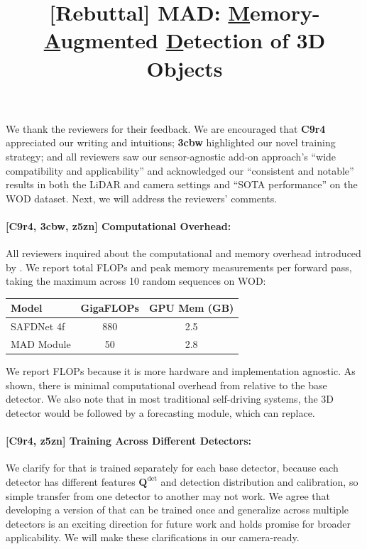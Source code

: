 \documentclass[10pt,twocolumn,letterpaper]{article}
\title{\vspace{-1mm}[Rebuttal] MAD: \underline{M}emory-\underline{A}ugmented \underline{D}etection of 3D Objects\vspace{-2mm}}
\newcommand{\reviewerOne}{{\textcolor{TealBlue}{\textbf{C9r4}}}}
\newcommand{\reviewerTwo}{{\textcolor{Mulberry}{\textbf{3cbw}}}}
\newcommand{\reviewerThree}{{\textcolor{BurntOrange}{\textbf{z5zn}}}}
\begin{document}
\makeatletter
{}
\makeatother

\maketitle
\thispagestyle{empty}
\appendix

We thank the reviewers for their feedback.
We are encouraged that \reviewerOne{} appreciated our writing and intuitions; \reviewerTwo{} highlighted our novel training strategy;
and all reviewers saw our sensor-agnostic add-on approach's ``wide compatibility and applicability'' and acknowledged our ``consistent and notable'' results in both the LiDAR and camera settings and ``SOTA performance'' on the WOD dataset. Next, we will address the reviewers' comments.

\paragraph{[\reviewerOne{}, \reviewerTwo{}, \reviewerThree{}] Computational Overhead:}
All reviewers inquired about the computational and memory overhead introduced by \ourmodel{}.
We report total FLOPs and peak memory measurements per forward pass,
taking the maximum across 10 random sequences on WOD:
\vspace{-2mm}
\begin{center}
\footnotesize
\begin{tabular}{lcc}
\toprule
\textbf{Model} & \textbf{GigaFLOPs} & \textbf{GPU Mem (GB)} \\
\midrule
SAFDNet 4f        & 880 & 2.5 \\
MAD Module        & 50  & 2.8 \\
\bottomrule
\end{tabular}
\end{center}
\vspace{-1mm}
We report FLOPs because it is more hardware and implementation agnostic.
As shown, there is minimal computational overhead from \ourmodel{} relative to the base detector.
We also note that in most traditional self-driving systems, the 3D detector would be followed by a forecasting module,
which \ourmodel{} can replace.

\paragraph{[\reviewerOne{}, \reviewerThree{}] Training \ourmodel{} Across Different Detectors:}
We clarify for that \ourmodel{} is trained separately for each base detector, because each detector has different features $\mathbf{Q}^{\textrm{det}}$ and detection distribution and calibration, so simple transfer from one detector to another may not work.
We agree that developing a version of \ourmodel{} that can be trained once and generalize across multiple detectors is an exciting direction for future work and holds promise for broader applicability. We will make these clarifications in our camera-ready.
\end{document}
